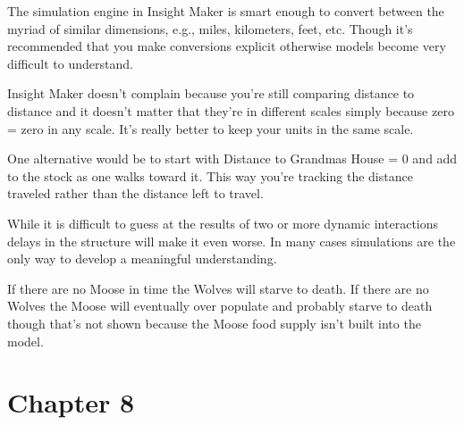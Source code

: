\documentclass[]{memoir}
\begin{document}

The simulation engine in Insight Maker is smart enough to convert
between the myriad of similar dimensions, e.g., miles, kilometers, feet,
etc. Though it's recommended that you make conversions explicit
otherwise models become very difficult to understand.

Insight Maker doesn't complain because you're still comparing distance
to distance and it doesn't matter that they're in different scales
simply because zero = zero in any scale. It's really better to keep your
units in the same scale.


One alternative would be to start with Distance to Grandmas House = 0
and add to the stock as one walks toward it. This way you're tracking
the distance traveled rather than the distance left to travel.


While it is difficult to guess at the results of two or more dynamic
interactions delays in the structure will make it even worse. In many
cases simulations are the only way to develop a meaningful
understanding.


If there are no Moose in time the Wolves will starve to death. If there
are no Wolves the Moose will eventually over populate and probably
starve to death though that's not shown because the Moose food supply
isn't built into the model.

\section{Chapter 8}
\end{document}
